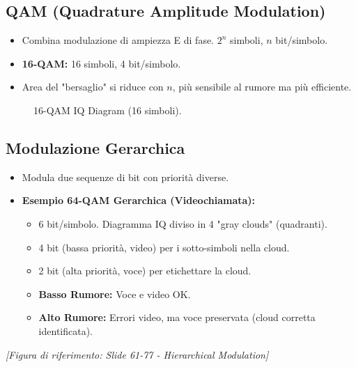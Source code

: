 \subsection{QAM (Quadrature Amplitude Modulation)}
\begin{itemize}
    \item Combina modulazione di ampiezza E di fase. $2^n$ simboli, $n$ bit/simbolo.
    \item \textbf{16-QAM:} 16 simboli, 4 bit/simbolo.
    \item Area del "bersaglio" si riduce con $n$, più sensibile al rumore ma più efficiente.
\end{itemize}
\begin{figure}[H] \centering
{} \caption{16-QAM IQ Diagram (16 simboli).} \end{figure}

\subsection{Modulazione Gerarchica}
\begin{itemize}
    \item Modula due sequenze di bit con priorità diverse.
    \item \textbf{Esempio 64-QAM Gerarchica (Videochiamata):}
    \begin{itemize}
        \item 6 bit/simbolo. Diagramma IQ diviso in 4 "gray clouds" (quadranti).
        \item 4 bit (bassa priorità, video) per i sotto-simboli nella cloud.
        \item 2 bit (alta priorità, voce) per etichettare la cloud.
        \item \textbf{Basso Rumore:} Voce e video OK.
        \item \textbf{Alto Rumore:} Errori video, ma voce preservata (cloud corretta identificata).
    \end{itemize}
\end{itemize}
\textit{[Figura di riferimento: Slide 61-77 - Hierarchical Modulation]}

